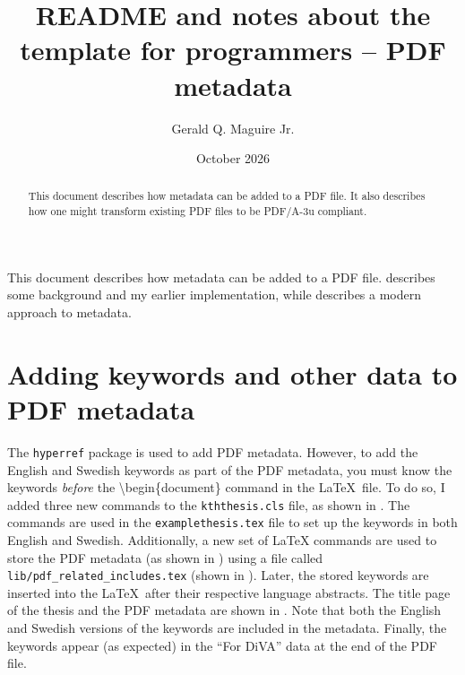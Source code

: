 \documentclass[12pt, twoside]{article}
\title{README and notes about the template for programmers -- PDF metadata}
\author{Gerald Q. Maguire Jr.}
\date{October 2026}
\renewcommand{\sectionmark}[1]{%
\markboth{#1}{}}
\newcommand{\fname}[1]{\texttt{#1}}
\begin{document}
\glsresetall
\maketitle
{}

\begin{abstract}
This document describes how metadata can be added to a \gls{PDF} file. It also describes how one might transform existing \gls{PDF} files to be PDF/A-3u compliant.

\end{abstract}
\cleardoublepage


\renewcommand{\sectionmark}[1]{ \markboth{#1}{}}
\tableofcontents
\markboth{\contentsname}{}
\cleardoublepage
 
\setcounter{page}{1}
\glsresetall
This document describes how metadata can be added to a \gls{PDF} file.  describes some background and my earlier implementation, while  describes a modern approach to metadata.

\section{Adding keywords and other data to PDF metadata}
\label{sec:addingKeywordsAndMetaDataToPDF}
The \texttt{hyperref} package is used to add \gls{PDF} metadata. However, to add the English and Swedish keywords as part of the \gls{PDF} metadata, you must know the keywords \textit{before} the \textbackslash begin\{document\} command in the \LaTeX{}~file. To do so, I added three new commands to the \texttt{kththesis.cls} file, as shown in . The commands are used in the \fname{examplethesis.tex} file to set up the keywords in both English and Swedish. Additionally, a new set of \LaTeX{} commands are used to store the \gls{PDF} metadata (as shown in ) using a file called \fname{lib/pdf\_related\_includes.tex} (shown in ). Later, the stored keywords are inserted into the \LaTeX{}~after their respective language abstracts. The title page of the thesis and the PDF metadata are shown in . Note that both the English and Swedish versions of the keywords are included in the metadata. Finally, the keywords appear (as expected) in the \enquote{For DiVA} data at the end of the \gls{PDF} file.
\end{document}
